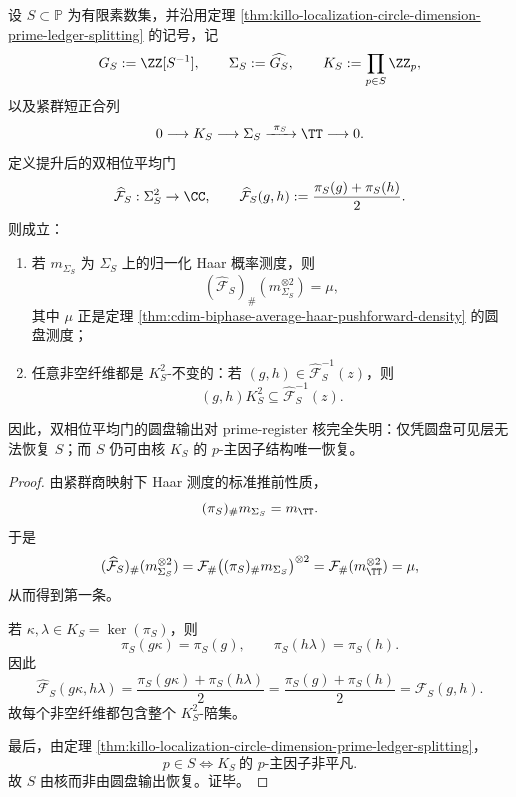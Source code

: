 \begin{theorem}\label{thm:cdim-biphase-average-solenoid-kernel-blindness}
设 \(S\subset\mathbb P\) 为有限素数集，并沿用定理 \ref{thm:killo-localization-circle-dimension-prime-ledger-splitting} 的记号，记
\[
G_S:=\ZZ[S^{-1}],
\qquad
\Sigma_S:=\widehat{G_S},
\qquad
K_S:=\prod_{p\in S}\ZZ_p,
\]
以及紧群短正合列
\[
0\longrightarrow K_S\longrightarrow \Sigma_S\xrightarrow{\ \pi_S\ }\TT\longrightarrow 0.
\]
定义提升后的双相位平均门
\[
\widehat{\mathcal F}_S:\Sigma_S^2\to\CC,
\qquad
\widehat{\mathcal F}_S(g,h):=\frac{\pi_S(g)+\pi_S(h)}{2}.
\]
则成立：
\begin{enumerate}
  \item 若 \(m_{\Sigma_S}\) 为 \(\Sigma_S\) 上的归一化 Haar 概率测度，则
  \[
  (\widehat{\mathcal F}_S)_{\#}(m_{\Sigma_S}^{\otimes 2})=\mu,
  \]
  其中 \(\mu\) 正是定理 \ref{thm:cdim-biphase-average-haar-pushforward-density} 的圆盘测度；
  \item 任意非空纤维都是 \(K_S^2\)-不变的：若 \((g,h)\in \widehat{\mathcal F}_S^{-1}(z)\)，则
  \[
  (g,h)K_S^2\subseteq \widehat{\mathcal F}_S^{-1}(z).
  \]
\end{enumerate}
因此，双相位平均门的圆盘输出对 prime-register 核完全失明：仅凭圆盘可见层无法恢复 \(S\)；而 \(S\) 仍可由核 \(K_S\) 的 \(p\)-主因子结构唯一恢复。
\end{theorem}
\begin{proof}
由紧群商映射下 Haar 测度的标准推前性质，
\[
(\pi_S)_{\#}m_{\Sigma_S}=m_{\TT}.
\]
于是
\[
(\widehat{\mathcal F}_S)_{\#}(m_{\Sigma_S}^{\otimes 2})
=
\mathcal F_{\#}\bigl((\pi_S)_{\#}m_{\Sigma_S}\bigr)^{\otimes 2}
=
\mathcal F_{\#}(m_{\TT}^{\otimes 2})
=
\mu,
\]
从而得到第一条。

若 \(\kappa,\lambda\in K_S=\ker(\pi_S)\)，则
\[
\pi_S(g\kappa)=\pi_S(g),
\qquad
\pi_S(h\lambda)=\pi_S(h).
\]
因此
\[
\widehat{\mathcal F}_S(g\kappa,h\lambda)
=
\frac{\pi_S(g\kappa)+\pi_S(h\lambda)}{2}
=
\frac{\pi_S(g)+\pi_S(h)}{2}
=
\widehat{\mathcal F}_S(g,h).
\]
故每个非空纤维都包含整个 \(K_S^2\)-陪集。

最后，由定理 \ref{thm:killo-localization-circle-dimension-prime-ledger-splitting}，
\[
p\in S
\iff
K_S\ \text{的 }p\text{-主因子非平凡}.
\]
故 \(S\) 由核而非由圆盘输出恢复。证毕。
\end{proof}

